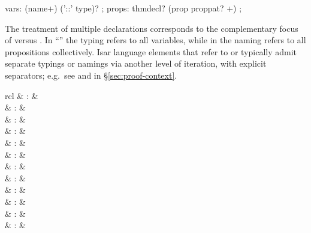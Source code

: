 \begin{isabellebody}
\begin{isamarkuptext}
  \begin{rail}
    vars: (name+) ('::' type)?
    ;
    props: thmdecl? (prop proppat? +)
    ;
  \end{rail}

  The treatment of multiple declarations corresponds to the
  complementary focus of  versus
  .  In ``''
  the typing refers to all variables, while in  the naming refers to all propositions collectively.
  Isar language elements that refer to  or
   typically admit separate typings or namings via
  another level of iteration, with explicit 
  separators; e.g.\ see  and  in
  \S\ref{sec:proof-context}.%
\end{isamarkuptext}%
\isamarkuptrue%
%
\isamarkuptrue%
%
\begin{isamarkuptext}%
\begin{matharray}{rcl}
     & : & \isarantiq \\
     & : & \isarantiq \\
     & : & \isarantiq \\
     & : & \isarantiq \\
     & : & \isarantiq \\
     & : & \isarantiq \\
     & : & \isarantiq \\
     & : & \isarantiq \\
     & : & \isarantiq \\
     & : & \isarantiq \\
     & : & \isarantiq \\
     & : & \isarantiq \\

\end{matharray}
\end{isamarkuptext}
\end{isabellebody}
